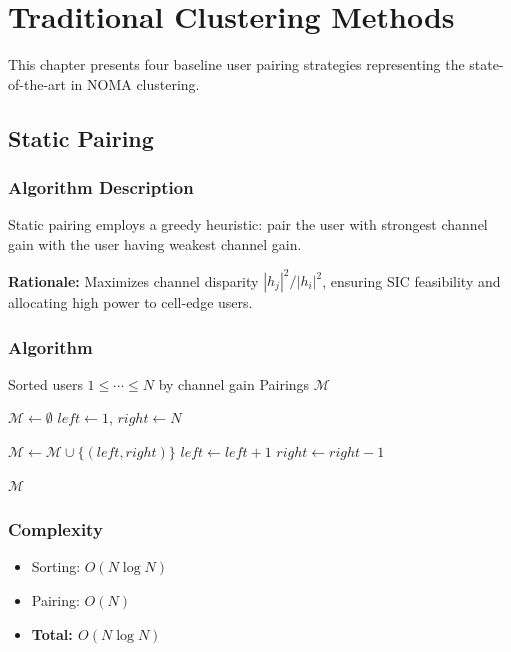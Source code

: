 \chapter{Traditional Clustering Methods}
\label{chap:traditional}

This chapter presents four baseline user pairing strategies representing the state-of-the-art in NOMA clustering.

\section{Static Pairing}

\subsection{Algorithm Description}

Static pairing employs a greedy heuristic: pair the user with strongest channel gain with the user having weakest channel gain.

\textbf{Rationale:} Maximizes channel disparity $|h_j|^2 / |h_i|^2$, ensuring SIC feasibility and allocating high power to cell-edge users.

\subsection{Algorithm}

\begin{algorithm}[H]
\caption{Static Pairing}
\label{alg:static}
\begin{algorithmic}[1]
\Require Sorted users $1 \leq \cdots \leq N$ by channel gain
\Ensure Pairings $\mathcal{M}$

\State $\mathcal{M} \gets \emptyset$
\State $left \gets 1$, $right \gets N$

    \State $\mathcal{M} \gets \mathcal{M} \cup \{(left, right)\}$
    \State $left \gets left + 1$
    \State $right \gets right - 1$
\EndWhile

\State \Return $\mathcal{M}$
\end{algorithmic}
\end{algorithm}

\subsection{Complexity}
\begin{itemize}
    \item Sorting: $O(N \log N)$
    \item Pairing: $O(N)$
    \item \textbf{Total: $O(N \log N)$}
\end{itemize}

